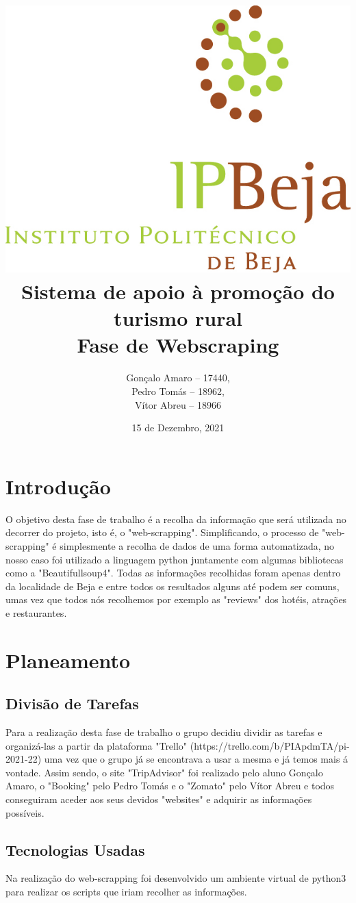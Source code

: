 \documentclass[a4paper,10pt]{article}
\title{\includegraphics[scale=0.5]{ipbeja_logo.png}\\[0.5cm]Sistema de apoio à promoção do turismo rural\\Fase de Webscraping} %
\author{Gonçalo Amaro -- 17440,\\ Pedro Tomás -- 18962,\\ Vítor Abreu -- 18966} %
\date{15 de Dezembro, 2021} %
\def\blankpage{%
      \clearpage%
      \thispagestyle{empty}%
      \addtocounter{page}{-1}%
      \null%
      \clearpage}
\begin{document}


\maketitle

\blankpage

{
  \hypersetup{linkcolor=black}
  \tableofcontents
}

\newpage

\section{Introdução}

O objetivo desta fase de trabalho é a recolha da informação que será utilizada no decorrer do projeto, isto é, o "web-scrapping". Simplificando, o processo de "web-scrapping" é simplesmente a recolha de dados de uma forma automatizada, no nosso caso foi utilizado a linguagem python juntamente com algumas bibliotecas como a "Beautifullsoup4". Todas as informações recolhidas foram apenas dentro da localidade de Beja e entre todos os resultados alguns até podem ser comuns, umas vez que todos nós recolhemos por exemplo as "reviews" dos hotéis, atrações e restaurantes.
\newpage

\section{Planeamento}

\subsection{Divisão de Tarefas}

Para a realização desta fase de trabalho o grupo decidiu dividir as tarefas e organizá-las a partir da plataforma "Trello" (https://trello.com/b/PIApdmTA/pi-2021-22) uma vez que o grupo já se encontrava a usar a mesma e já temos mais á vontade. Assim sendo, o site "TripAdvisor" foi realizado pelo aluno Gonçalo Amaro, o "Booking" pelo Pedro Tomás e o "Zomato" pelo Vítor Abreu e todos conseguiram aceder aos seus devidos "websites" e adquirir as informações possíveis. 

\subsection{Tecnologias Usadas}

Na realização do web-scrapping foi desenvolvido um ambiente virtual de python3 para realizar os scripts que iriam recolher as informações. 
\end{document}
